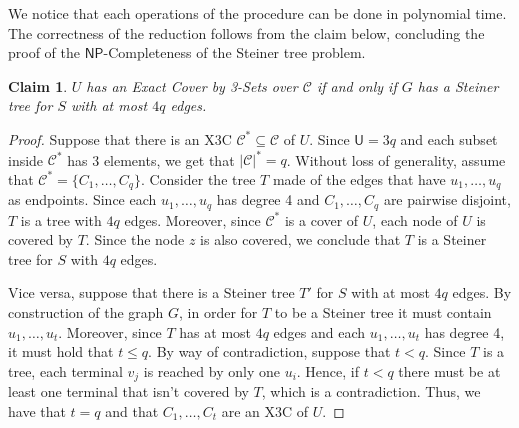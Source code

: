 \documentclass[12pt,a4paper]{article}
\newtheorem{claim}{Claim}
\newcommand{\abs}[1]{\left|#1\right|}
\begin{document}
    We notice that each operations of the procedure can be done in polynomial time. The correctness of the reduction follows from the claim below, concluding the proof of the $\mathsf{NP}$-Completeness of the Steiner tree problem.

    \begin{claim}
        $U$ has an Exact Cover by 3-Sets over $\mathcal{C}$ if and only if $G$ has a Steiner tree for $S$ with at most $4q$ edges.
    \end{claim}

    \begin{proof}
        Suppose that there is an X3C $\mathcal{C}^* \subseteq \mathcal{C}$ of $U$. Since $\mathsf{U} = 3q$ and each subset inside $\mathcal{C}^*$ has 3 elements, we get that $\abs{\mathcal{C}}^* = q$. Without loss of generality, assume that $\mathcal{C}^* = \{C_1, \ldots, C_q\}$. Consider the tree $T$ made of the edges that have $u_1, \ldots, u_q$ as endpoints. Since each $u_1, \ldots, u_q$ has degree 4 and $C_1, \ldots, C_q$ are pairwise disjoint, $T$ is a tree with $4q$ edges. Moreover, since $\mathcal{C}^*$ is a cover of $U$, each node of $U$ is covered by $T$. Since the node $z$ is also covered, we conclude that $T$ is a Steiner tree for $S$ with $4q$ edges.

        Vice versa, suppose that there is a Steiner tree $T'$ for $S$ with at most $4q$ edges. By construction of the graph $G$, in order for $T$ to be a Steiner tree it must contain $u_1, \ldots, u_t$. Moreover, since $T$ has at most $4q$ edges and each $u_1, \ldots, u_t$ has degree 4, it must hold that $t \leq q$. By way of contradiction, suppose that $t < q$. Since $T$ is a tree, each terminal $v_j$ is reached by only one $u_i$. Hence, if $t < q$ there must be at least one terminal that isn't covered by $T$, which is a contradiction. Thus, we have that $t = q$ and that $C_1, \ldots, C_t$ are an X3C of $U$.
    \end{proof}

    \printbibliography
\end{document}
